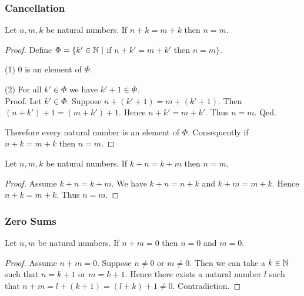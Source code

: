 \documentclass[10pt]{article}
\begin{document}
  \subsubsection*{Cancellation}

  \begin{forthel}
    \begin{proposition}
      Let $n, m, k$ be natural numbers.
      If $n + k = m + k$ then $n = m$.
    \end{proposition}
    \begin{proof}
      Define $\Phi = \{ k' \in \mathbb{N} \mid$ if $n + k' = m + k'$ then $n = m \}$.

      (1) $0$ is an element of $\Phi$.

      (2) For all $k' \in \Phi$ we have $k' + 1 \in \Phi$. \\
      Proof.
        Let $k' \in \Phi$.
        Suppose $n + (k' + 1) = m + (k' + 1)$.
        Then $(n + k') + 1 = (m + k') + 1$.
        Hence $n + k' = m + k'$.
        Thus $n = m$.
      Qed.

      Therefore every natural number is an element of $\Phi$.
      Consequently if $n + k = m + k$ then $n = m$.
    \end{proof}
  \end{forthel}

  \begin{forthel}
    \begin{corollary}
      Let $n, m, k$ be natural numbers.
      If $k + n = k + m$ then $n = m$.
    \end{corollary}
    \begin{proof}
      Assume $k + n = k + m$.
      We have $k + n = n + k$ and $k + m = m + k$.
      Hence $n + k = m + k$.
      Thus $n = m$.
    \end{proof}
  \end{forthel}


  \subsubsection*{Zero Sums}

  \begin{forthel}
    \begin{proposition}
      Let $n, m$ be natural numbers.
      If $n + m = 0$ then $n = 0$ and $m = 0$.
    \end{proposition}
    \begin{proof}
      Assume $n + m = 0$.
      Suppose $n \neq 0$ or $m \neq 0$.
      Then we can take a $k \in \mathbb{N}$ such that $n = k + 1$ or $m = k + 1$.
      Hence there exists a natural number $l$ such that
      $n + m
        = l + (k + 1)
        = (l + k) + 1
        \neq 0$.
      Contradiction.
    \end{proof}
  \end{forthel}
\end{document}
